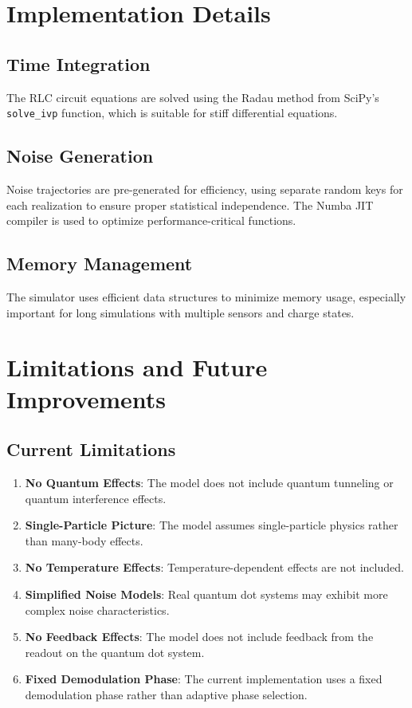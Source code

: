 \documentclass{article}
\begin{document}
\section{Implementation Details}

\subsection{Time Integration}

The RLC circuit equations are solved using the Radau method from SciPy's \texttt{solve\_ivp} function, which is suitable for stiff differential equations.

\subsection{Noise Generation}

Noise trajectories are pre-generated for efficiency, using separate random keys for each realization to ensure proper statistical independence. The Numba JIT compiler is used to optimize performance-critical functions.

\subsection{Memory Management}

The simulator uses efficient data structures to minimize memory usage, especially important for long simulations with multiple sensors and charge states.

\section{Limitations and Future Improvements}

\subsection{Current Limitations}

\begin{enumerate}
\item \textbf{No Quantum Effects}: The model does not include quantum tunneling or quantum interference effects.
\item \textbf{Single-Particle Picture}: The model assumes single-particle physics rather than many-body effects.
\item \textbf{No Temperature Effects}: Temperature-dependent effects are not included.
\item \textbf{Simplified Noise Models}: Real quantum dot systems may exhibit more complex noise characteristics.
\item \textbf{No Feedback Effects}: The model does not include feedback from the readout on the quantum dot system.
\item \textbf{Fixed Demodulation Phase}: The current implementation uses a fixed demodulation phase rather than adaptive phase selection.
\end{enumerate}
\end{document}
